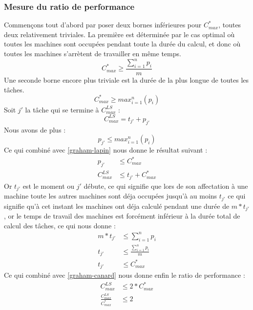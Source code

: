 \subsubsection{Mesure du ratio de performance}
Commençons tout d'abord par poser deux bornes inférieures pour $C^*_{max}$, 
toutes deux relativement triviales. La première est déterminée par le cas 
optimal où toutes les machines sont occupées pendant toute la durée du calcul, 
et donc où toutes les machines s'arrètent de travailler en même temps.
\begin{equation}
\label{graham-chien}
C^*_{max} \geq \frac{\sum_{i=1}^n p_{i}}{m}
\end{equation}
Une seconde borne encore plus triviale est la durée de la plus longue de toutes 
les tâches.
\begin{equation}
\label{graham-lapin}
C^*_{max} \geq max^n_{i=1}(p_{i})
\end{equation}
Soit $j'$ la tâche qui se termine à $C^{LS}_{max}$ :
\begin{equation}
C^{LS}_{max} = t_{j'} + p_{j'}
\end{equation}
Nous avons de plus :
\begin{equation}
p_{j'} \leq max^n_{i=1}(p_{i})
\end{equation}
Ce qui combiné avec \eqref{graham-lapin} nous donne le résultat suivant :
\begin{align}
p_{j'} &\leq C^*_{max} \\
\label{graham-canard}
C^{LS}_{max} &\leq t_{j'} + C^*_{max}
\end{align}
Or $t_{j'}$ est le moment ou $j'$ débute, ce qui signifie que lors de son 
affectation à une machine toute les autres machines sont déja occupées jusqu'à 
au moins $t_{j'}$ ce qui signifie qu'à cet instant les machines ont déja calculé 
pendant une durée de $m*t_{j'}$, or le temps de travail des machines est 
forcément inférieur à la durée total de calcul des tâches, ce qui nous donne :
\begin{align}
m*t_{j'} &\leq \sum_{i=1}^n p_{i} \\
\label{graham-ours}
t_{j'} &\leq \frac{\sum_{i=1}^n p_{i}}{m} \\
t_{j'} &\leq C^*_{max}
\end{align}
Ce qui combiné avec \eqref{graham-canard} nous donne enfin le ratio de 
performance :
\begin{align}
C^{LS}_{max} &\leq 2*C^*_{max} \\
\frac{C^{LS}_{max}}{C^*_{max}} &\leq 2 
\end{align}
